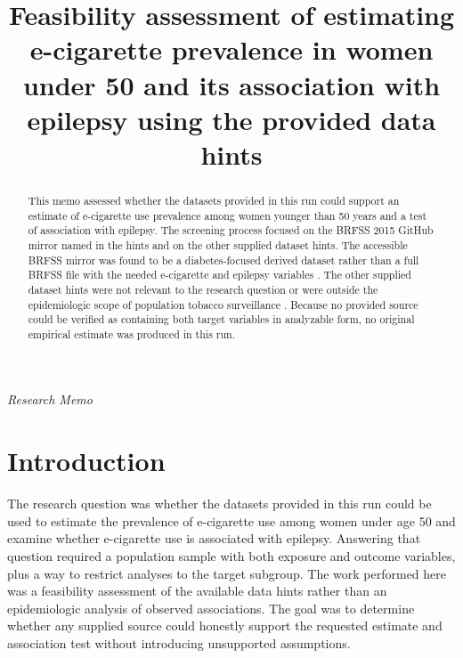 \documentclass[11pt]{article}
\title{Feasibility assessment of estimating e-cigarette prevalence in women under 50 and its association with epilepsy using the provided data hints}
\author{}
\date{}
\begin{document}
\maketitle

\begin{center}\small\textit{Research Memo}\end{center}

\begin{abstract}

This memo assessed whether the datasets provided in this run could support an estimate of e-cigarette use prevalence among women younger than 50 years and a test of association with epilepsy. The screening process focused on the BRFSS 2015 GitHub mirror named in the hints and on the other supplied dataset hints. The accessible BRFSS mirror was found to be a diabetes-focused derived dataset rather than a full BRFSS file with the needed e-cigarette and epilepsy variables \cite{ref1}. The other supplied dataset hints were not relevant to the research question or were outside the epidemiologic scope of population tobacco surveillance \cite{ref2}. Because no provided source could be verified as containing both target variables in analyzable form, no original empirical estimate was produced in this run.

\end{abstract}

\section{Introduction}
The research question was whether the datasets provided in this run could be used to estimate the prevalence of e-cigarette use among women under age 50 and examine whether e-cigarette use is associated with epilepsy. Answering that question required a population sample with both exposure and outcome variables, plus a way to restrict analyses to the target subgroup. The work performed here was a feasibility assessment of the available data hints rather than an epidemiologic analysis of observed associations. The goal was to determine whether any supplied source could honestly support the requested estimate and association test without introducing unsupported assumptions.
\end{document}
